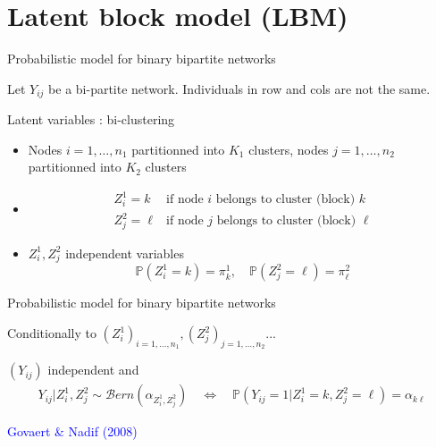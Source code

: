 \documentclass[compress,10pt]{beamer}
\begin{document}

\section{Latent block model (LBM)}

\begin{frame}{Probabilistic model for binary  bipartite networks}

Let $Y_{ij}$ be a bi-partite network. Individuals in row and cols are not the same. 

\begin{block}{Latent variables : bi-clustering}
\begin{itemize}
\item Nodes $i= 1,\dots,n_1$   partitionned into $K_1$ clusters,  nodes $j= 1,\dots,n_2$  partitionned into $K_2$ clusters
\item $$\begin{array}{cl}
Z^1_i = k & \mbox{if node $i$ belongs to cluster (block) $k$}\\
Z^2_j = \ell & \mbox{if node $j$ belongs to cluster (block) $\ell$}
\end{array}$$
\item $Z^1_i, Z^2_j$ independent variables
$$ \mathbb{P}(Z^1_i = k) = \pi^1_k,\quad  \mathbb{P}(Z^2_j = \ell) = \pi^2_\ell$$
\end{itemize}
\end{block}

\end{frame}


\begin{frame}{Probabilistic model for binary  bipartite networks}


\begin{block}{Conditionally to $(Z^1_i)_{i=1,\dots,n_1},(Z^2_j)_{j=1,\dots,n_2}$... }

$(Y_{ij})$ independent and 
\begin{eqnarray*}
 Y_{ij}  | Z^1_i, Z^2_j \sim  \mathcal{B}ern(\alpha_{Z^1_i,Z^2_j}) \quad \Leftrightarrow \quad   \mathbb{P}(Y_{ij} = 1 | Z^1_i = k, Z^2_j = \ell)  =  \alpha_{k\ell}
\end{eqnarray*}
\end{block}
 

\textcolor{blue}{Govaert \& Nadif (2008)}  


\end{frame}
\end{document}
